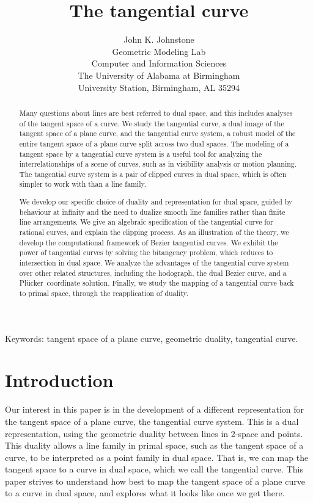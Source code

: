 \documentclass[12pt]{article}
\title{The tangential curve}
\author{John K. Johnstone\\
	Geometric Modeling Lab\\
	Computer and Information Sciences\\
	The University of Alabama at Birmingham\\
	University Station, Birmingham, AL 35294}
\newcommand{\plucker}{Pl\"{u}cker\ }
\begin{document}
\maketitle


\begin{abstract}
Many questions about lines are best referred to dual space, 
and this includes analyses of the tangent space of a curve.
We study the tangential curve, a dual image of the tangent space of
a plane curve, and the tangential curve system, a robust model of the entire tangent
space of a plane curve split across two dual spaces.
The modeling of a tangent space by a tangential curve system
is a useful tool for analyzing the interrelationships of a scene of curves, 
such as in visibility analysis or motion planning.
The tangential curve system is a pair of clipped curves in dual space, which is
often simpler to work with than a line family.

We develop our specific choice of duality and representation for dual space,
guided by behaviour at infinity and the need to dualize smooth
line families rather than finite line arrangements.
We give an algebraic specification of the tangential curve for 
rational curves, and explain the clipping process.
As an illustration of the theory, 
we develop the computational framework of Bezier tangential curves.
We exhibit the power of tangential curves by solving the bitangency problem,
which reduces to intersection in dual space.
We analyze the advantages of the tangential curve system over other 
related structures, including the hodograph, the dual Bezier curve, and a
\plucker coordinate solution.
Finally, we study the mapping of a tangential curve back to
primal space, through the reapplication of duality.
\end{abstract}

\noindent Keywords: tangent space of a plane curve, geometric duality,
		    tangential curve.

\clearpage


\section{Introduction}

Our interest in this paper is in the development of 
a different representation for the
tangent space of a plane curve, the tangential curve system.
This is a dual representation, using the geometric duality between lines in 2-space and points.
This duality allows a line family in primal space, such as the tangent space of a curve,
to be interpreted as a point family in dual space.
That is, we can map the tangent space to a curve in dual space, which
we call the tangential curve.
This paper strives to understand how best to map the tangent space of a plane curve 
to a curve in dual space, and explores what it looks like once we get there.
\end{document}
